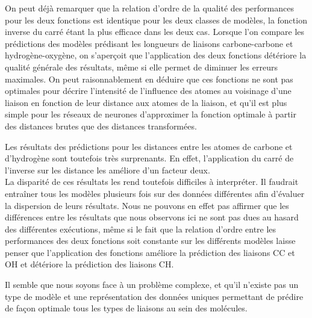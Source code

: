 \par On peut déjà remarquer que la relation d'ordre de la qualité des performances pour les deux fonctions est identique pour les deux classes de modèles, la fonction inverse du carré étant la plus efficace dans les deux cas. Lorsque l'on compare les prédictions des modèles prédisant les longueurs de liaisons carbone-carbone et hydrogène-oxygène, on s'aperçoit que l'application des deux fonctions détériore la qualité générale des résultats, même si elle permet de diminuer les erreurs maximales. On peut raisonnablement en déduire que ces fonctions ne sont pas optimales pour décrire l'intensité de l'influence des atomes au voisinage d'une liaison en fonction de leur distance aux atomes de la liaison, et qu'il est plus simple pour les réseaux de neurones d'approximer la fonction optimale à partir des distances brutes que des distances transformées.
\par Les résultats des prédictions pour les distances entre les atomes de carbone et d'hydrogène sont toutefois très surprenants. En effet, l'application du carré de l'inverse sur les distance les améliore d'un facteur deux. \\
La disparité de ces résultats les rend toutefois difficiles à interpréter. Il faudrait entraîner tous les modèles plusieurs fois sur des données différentes afin d'évaluer la dispersion de leurs résultats. Nous ne pouvons en effet pas affirmer que les différences entre les résultats que nous observons ici ne sont pas dues au hasard des différentes exécutions, même si le fait que la relation d'ordre entre les performances des deux fonctions soit constante sur les différents modèles laisse  penser que l'application des fonctions améliore la prédiction des liaisons CC et OH et détériore la prédiction des liaisons CH.\\
\par Il semble que nous soyons face à un problème complexe, et qu'il n'existe pas un type de modèle et une représentation des données uniques permettant de prédire de façon optimale tous les types de liaisons au sein des molécules.

